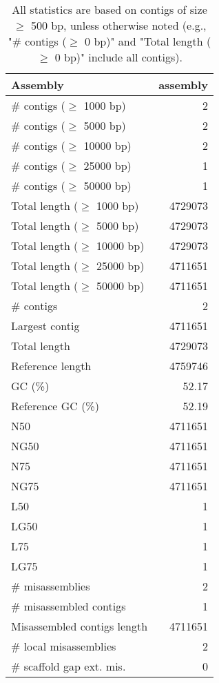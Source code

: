 \documentclass[12pt,a4paper]{article}
\begin{document}
\begin{table}[ht]
\begin{center}
\caption{All statistics are based on contigs of size $\geq$ 500 bp, unless otherwise noted (e.g., "\# contigs ($\geq$ 0 bp)" and "Total length ($\geq$ 0 bp)" include all contigs).}
\begin{tabular}{|l*{1}{|r}|}
\hline
Assembly & assembly \\ \hline
\# contigs ($\geq$ 1000 bp) & 2 \\ \hline
\# contigs ($\geq$ 5000 bp) & 2 \\ \hline
\# contigs ($\geq$ 10000 bp) & 2 \\ \hline
\# contigs ($\geq$ 25000 bp) & 1 \\ \hline
\# contigs ($\geq$ 50000 bp) & 1 \\ \hline
Total length ($\geq$ 1000 bp) & 4729073 \\ \hline
Total length ($\geq$ 5000 bp) & 4729073 \\ \hline
Total length ($\geq$ 10000 bp) & 4729073 \\ \hline
Total length ($\geq$ 25000 bp) & 4711651 \\ \hline
Total length ($\geq$ 50000 bp) & 4711651 \\ \hline
\# contigs & 2 \\ \hline
Largest contig & 4711651 \\ \hline
Total length & 4729073 \\ \hline
Reference length & 4759746 \\ \hline
GC (\%) & 52.17 \\ \hline
Reference GC (\%) & 52.19 \\ \hline
N50 & 4711651 \\ \hline
NG50 & 4711651 \\ \hline
N75 & 4711651 \\ \hline
NG75 & 4711651 \\ \hline
L50 & 1 \\ \hline
LG50 & 1 \\ \hline
L75 & 1 \\ \hline
LG75 & 1 \\ \hline
\# misassemblies & 2 \\ \hline
\# misassembled contigs & 1 \\ \hline
Misassembled contigs length & 4711651 \\ \hline
\# local misassemblies & 2 \\ \hline
\# scaffold gap ext. mis. & 0 \\ \hline

\end{tabular}
\end{center}
\end{table}
\end{document}
